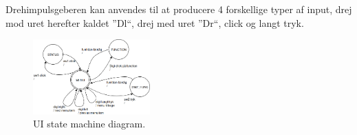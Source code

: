 Drehimpulsgeberen kan anvendes til at producere 4 forskellige typer af input, drej mod uret herefter kaldet ''Dl``, drej med uret ''Dr``, click og langt tryk.

\begin{figure} 
	\centering 
	\includegraphics[width=4.5cm]{billeder/ui_statemachine.png} 
	\caption{UI state machine diagram. } 
	\label{fig:uistatemachine} 
\end{figure}

